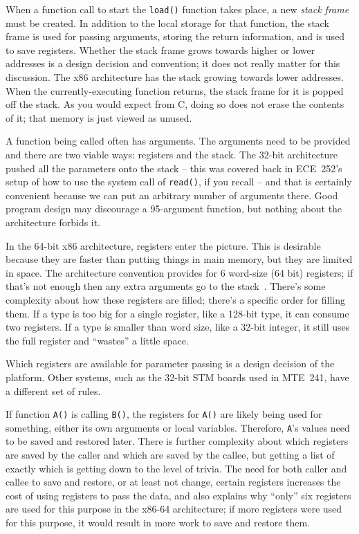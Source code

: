 When a function call to start the \texttt{load()} function takes place, a new \textit{stack frame} must be created. In addition to the local storage for that function, the stack frame is used for passing arguments, storing the return information, and is used to save registers. Whether the stack frame grows towards higher or lower addresses is a design decision and convention; it does not really matter for this discussion. The x86 architecture has the stack growing towards lower addresses. When the currently-executing function returns, the stack frame for it is popped off the stack. As you would expect from C, doing so does not erase the contents of it; that memory is just viewed as unused. 

A function being called often has arguments. The arguments need to be provided and there are two viable ways: registers and the stack. The 32-bit architecture pushed all the parameters onto the stack -- this was covered back in ECE~252's setup of how to use the system call of \texttt{read()}, if you recall -- and that is certainly convenient because we can put an arbitrary number of arguments there. Good program design may discourage a 95-argument function, but nothing about the architecture forbids it. 

In the 64-bit x86 architecture, registers enter the picture. This is desirable because they are faster than putting things in main memory, but they are limited in space. The architecture convention provides for 6 word-size (64 bit) registers; if that's not enough then any extra arguments go to the stack~\cite{csapp}. There's some complexity about how these registers are filled; there's a specific order for filling them. If a type is too big for a single register, like a 128-bit type, it can consume two registers. If a type is smaller than word size, like a 32-bit integer, it still uses the full register and ``wastes'' a little space. 

Which registers are available for parameter passing is a design decision of the platform. Other systems, such as the 32-bit STM boards used in MTE~241, have a different set of rules. 

If function \texttt{A()} is calling \texttt{B()}, the registers for \texttt{A()} are likely being used for something, either its own arguments or local variables. Therefore, \texttt{A}'s values need to be saved and restored later. There is further complexity about which registers are saved by the caller and which are saved by the callee, but getting a list of exactly which is getting down to the level of trivia.  The need for both caller and callee to save and restore, or at least not change, certain registers increases the cost of using registers to pass the data, and also explains why ``only'' six registers are used for this purpose in the x86-64 architecture; if more registers were used for this purpose, it would result in more work to save and restore them. 


